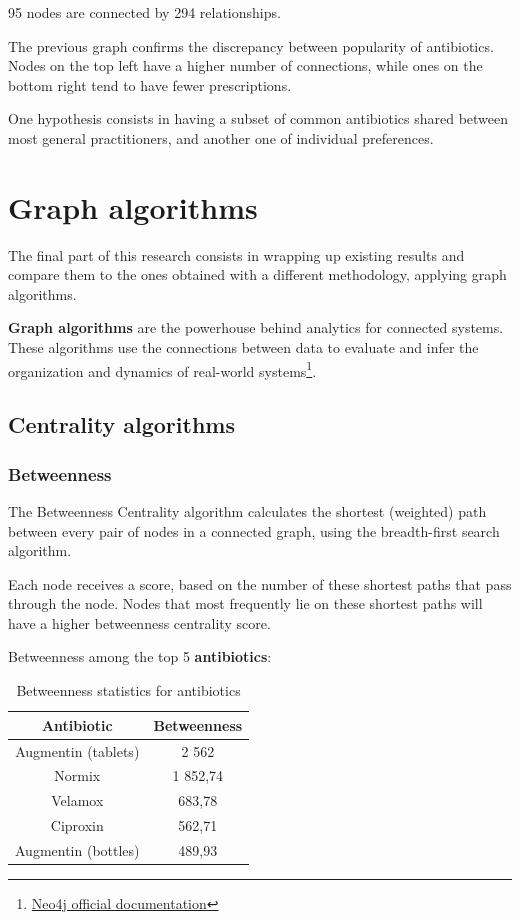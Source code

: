 95 nodes are connected by 294 relationships.

The previous graph confirms the discrepancy between popularity of antibiotics. Nodes on the top left have a higher number of connections, while ones on the bottom right tend to have fewer prescriptions.

One hypothesis consists in having a subset of common antibiotics shared between most general practitioners, and another one of individual preferences.

\section{Graph algorithms}
The final part of this research consists in wrapping up existing results and compare them to the ones obtained with a different methodology, applying graph algorithms.

\textbf{Graph algorithms} are the powerhouse behind analytics for connected systems. These algorithms use the connections between data to evaluate and infer the organization and dynamics of real-world systems\footnote{\href{https://neo4j.com/docs/pdf/neo4j-graph-algorithms-3.5.pdf}{Neo4j official documentation}}.

\subsection{Centrality algorithms}

\subsubsection{Betweenness}
The Betweenness Centrality algorithm calculates the shortest (weighted) path between every pair of nodes in a connected graph, using the breadth-first search algorithm. 

Each node receives a score, based on the number of these shortest paths that pass through the node. Nodes that most frequently lie on these shortest paths will have a higher betweenness centrality score. 

Betweenness among the top 5 \textbf{antibiotics}:
\begin{table}[h]
	\centering
	\begin{tabular}{c|c}
		\textbf{Antibiotic} & \textbf{Betweenness} \\
		\hline
		Augmentin (tablets) & 2 562 \\
		\hline
		Normix & 1 852,74 \\
		\hline
		Velamox & 683,78 \\
		\hline
		Ciproxin & 562,71 \\
		\hline
		Augmentin (bottles) & 489,93 \\
	\end{tabular}
\caption{\small Betweenness statistics for antibiotics}
\end{table}


